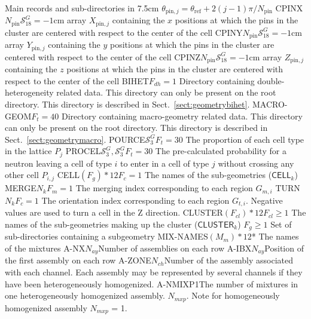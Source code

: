 \begin{DescriptionEnregistrement}{Main records and sub-directories in }{7.5cm}
{$\theta_{\text{pin},j}=\theta_{\text{ref}}+2(j-1)\pi/N_{\text{pin}}$}
\OptRealEnr
  {CPINX}{$N_{\text{pin}}$}{$\mathcal{S}^{G}_{18}=-1$}{cm}
  {array $X_{\text{pin},j}$ containing the $x$ positions at which the pins in the cluster are centered with respect to the center of the cell}
\OptRealEnr
  {CPINY}{$N_{\text{pin}}$}{$\mathcal{S}^{G}_{18}=-1$}{cm}
  {array $Y_{\text{pin},j}$ containing the $y$ positions at which the pins in the cluster are centered with respect to the center of the cell}
\OptRealEnr
  {CPINZ}{$N_{\text{pin}}$}{$\mathcal{S}^{G}_{18}=-1$}{cm}
  {array $Z_{\text{pin},j}$ containing the $z$ positions at which the pins in the cluster are centered with respect to the center of the cell}
\OptDirEnr
  {BIHET}{$F_{dh}=1$}
  {Directory containing double-heterogeneity related data. This directory can only be present on the root directory. This directory is described in Sect.~\ref{sect:geometrybihet}.}
\OptDirEnr
  {MACRO-GEOM}{$F_{t}=40$}
  {Directory containing macro-geometry related data. This directory can only be present on the root directory. This directory is described in Sect.~\ref{sect:geometrymacro}.}
\OptRealEnr
  {POURCE}{$\mathcal{S}^{G}_{3}$}{$F_{t}=30$}{}
  {The proportion of each cell type in the lattice $P_{j}$}
\OptRealEnr
  {PROCEL}{$\mathcal{S}^{G}_{3},\mathcal{S}^{G}_{3}$}{$F_{t}=30$}{}
  {The pre-calculated probability for a neutron leaving a cell of type $i$ to enter in a
  cell of type $j$ without crossing any other cell $P_{i,j}$}
\OptCharEnr
  {CELL}{$(F_{g})*12$}{$F_{c}=1$}
  {The names of the sub-geometries ($\mathsf{CELL}_{k}$)}
\OptIntEnr
  {MERGE}{$N_{k}$}{$F_{m}=1$}
  {The merging index corresponding to each region $G_{m,i}$}
\OptIntEnr
  {TURN}{$N_{k}$}{$F_{c}=1$}
  {The orientation index corresponding to each region $G_{t,i}$. Negative values are used to turn a cell in the Z direction.}
\OptCharEnr
  {CLUSTER}{$(F_{cl})*12$}{$F_{cl}\ge 1$}
  {The names of the sub-geometries making up the cluster ($\mathsf{CLUSTER}_{k}$)}
\OptDirVar
  {}{$F_{g}\ge 1$}
  {Set of sub-directories containing a subgeometry}
\OptCharEnr
  {MIX-NAMES}{$(M_{m})*12$}{*}
  {The names of the mixtures}
\IntEnr
  {A-NX}{$N_{ay}$}{Number of assemblies on each row}
\IntEnr
  {A-IBX}{$N_{ay}$}{Position of the first assembly on each row}
\IntEnr
  {A-ZONE}{$N_{ch}$}{Number of the assembly associated with each channel. Each assembly may be represented by several channels if they have been heterogeneously homogenized.}
\IntEnr
  {A-NMIXP}{1}{The number of mixtures in one heterogeneously homogenized assembly. $N_{mxp}$. Note for homogeneously  homogenized assembly  $N_{mxp}$ = 1.}
\end{DescriptionEnregistrement}

